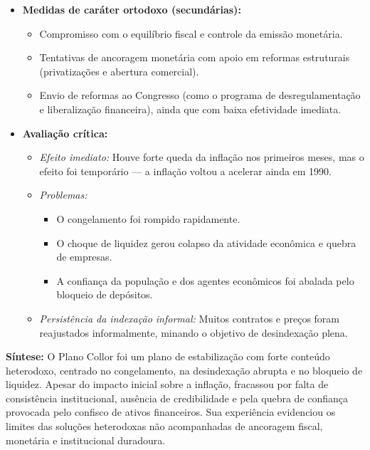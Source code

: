 \documentclass{sciposter}
\begin{document}
\begin{multicols}{3}
\begin{itemize}
    \item \textbf{ Medidas de caráter ortodoxo (secundárias):}
    \begin{itemize}
        \item Compromisso com o equilíbrio fiscal e controle da emissão monetária.
        \item Tentativas de ancoragem monetária com apoio em reformas estruturais (privatizações e abertura comercial).
        \item Envio de reformas ao Congresso (como o programa de desregulamentação e liberalização financeira), ainda que com baixa efetividade imediata.
    \end{itemize}

    \item \textbf{ Avaliação crítica:}
    \begin{itemize}
        \item \textit{Efeito imediato:} Houve forte queda da inflação nos primeiros meses, mas o efeito foi temporário — a inflação voltou a acelerar ainda em 1990.
        \item \textit{Problemas:}
        \begin{itemize}
            \item O congelamento foi rompido rapidamente.
            \item O choque de liquidez gerou colapso da atividade econômica e quebra de empresas.
            \item A confiança da população e dos agentes econômicos foi abalada pelo bloqueio de depósitos.
        \end{itemize}
        \item \textit{Persistência da indexação informal:} Muitos contratos e preços foram reajustados informalmente, minando o objetivo de desindexação plena.
    \end{itemize}
\end{itemize}

\textbf{Síntese:} O Plano Collor foi um plano de estabilização com forte conteúdo heterodoxo, centrado no congelamento, na desindexação abrupta e no bloqueio de liquidez. Apesar do impacto inicial sobre a inflação, fracassou por falta de consistência institucional, ausência de credibilidade e pela quebra de confiança provocada pelo confisco de ativos financeiros. Sua experiência evidenciou os limites das soluções heterodoxas não acompanhadas de ancoragem fiscal, monetária e institucional duradoura.



\end{multicols}
\end{document}
